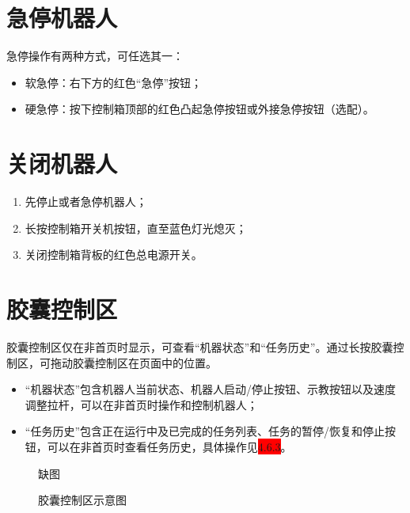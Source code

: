 \section{急停机器人}

急停操作有两种方式，可任选其一：
\begin{itemize}
	\item 软急停：\LM 右下方的红色“急停”按钮；
	\item 硬急停：按下控制箱顶部的红色凸起急停按钮或外接急停按钮（选配）。
\end{itemize}


\section{关闭机器人}
\begin{enumerate}
	\item 先停止或者急停机器人；
	\item 长按控制箱开关机按钮，直至蓝色灯光熄灭；
	\item 关闭控制箱背板的红色总电源开关。
\end{enumerate}


\section{胶囊控制区}
胶囊控制区仅在非首页时显示，可查看“机器状态”和“任务历史”。通过长按胶囊控制区，可拖动胶囊控制区在页面中的位置。
\begin{itemize}
	\item “机器状态”包含机器人当前状态、机器人启动/停止按钮、示教按钮以及速度调整拉杆，可以在非首页时操作和控制机器人；
	\item “任务历史”包含正在运行中及已完成的任务列表、任务的暂停/恢复和停止按钮，可以在非首页时查看任务历史，具体操作见\colorbox{red}{4.6.3}。
\end{itemize}

\begin{figure}[ht]
	\centering
	\color{red}缺图
	\caption{胶囊控制区示意图}
	\label{fig:胶囊控制区示意图}
\end{figure}
